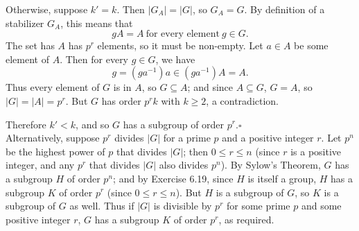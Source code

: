 \documentclass{homework}
\begin{document}
\begin{solution}
  Otherwise, suppose $k'=k$. Then $\left| G_A \right| =\left| G \right| $, so $G_A=G$. By definition
  of a stabilizer $G_A$, this means that \[
    gA=A~\text{for every element}~g\in G
  .\] The set has $A$ has $p^r$ elements, so it must be non-empty. Let $a\in A$ be some element of
  $A$. Then for every $g\in G$, we have \[
    g=(ga^{-1})a\in (ga^{-1})A=A
  .\] Thus every element of $G$ is in $A$, so $G\subseteq A$; and since $A\subseteq G$, $G=A$, so
  $\left| G \right| =\left| A \right| =p^r$. But $G$ has order $p^rk$ with $k\ge 2$, a
  contradiction.

  Therefore $k'<k$, and so $G$ has a subgroup of order $p^r$.\hfill$\square$\\

  Alternatively, suppose $p^r$ divides $\left| G \right| $ for a prime $p$ and a positive
  integer $r$. Let $p^n$ be the highest power of $p$ that divides $\left| G \right| $; then $0\le
  r\le n$ (since $r$ is a positive integer, and any $p^r$ that divides $\left| G \right| $ also
  divides $p^n$). By Sylow's Theorem, $G$ has a subgroup $H$ of order $p^n$; and by Exercise 6.19,
  since $H$ is itself a group, $H$ has a subgroup $K$ of order $p^r$ (since $0\le r\le n$). But $H$
  is a subgroup of $G$, so $K$ is a subgroup of $G$ as well. Thus if $\left| G \right|$ is divisible
  by $p^r$ for some prime $p$ and some positive integer $r$, $G$ has a subgroup $K$ of order $p^r$,
  as required.
  
\end{solution}
\end{document}
